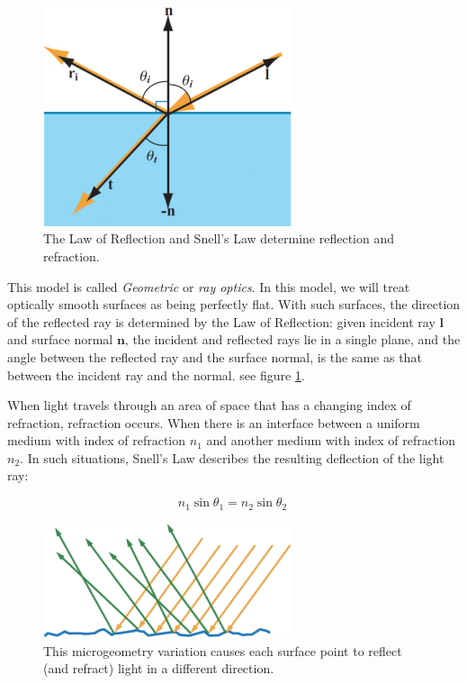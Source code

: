 \begin{figure}
\sidecaption
	\includegraphics[width=0.65\textwidth]{graphics/gi/ray-optics-1}
	\caption{The Law of Reflection and Snell's Law determine reflection and refraction.}
	\label{f:Ray-optics-model}
\end{figure}

This model is called \textit{Geometric} or \textit{ray optics}. In this model, we will treat optically smooth surfaces as being perfectly flat. With such surfaces, the direction of the reflected ray is determined by the Law of Reflection: given incident ray $\mathbf{l}$ and surface normal $\mathbf{n}$, the incident and reflected rays lie in a single plane, and the angle between the reflected ray and the surface normal, is the same as that between the incident ray and the normal. see figure \ref{f:Ray-optics-model}.

When light travels through an area of space that has a changing index of refraction, refraction occurs. When there is an interface between a uniform medium with index of refraction $n_1$ and another medium with index of refraction $n_2$. In such situations, Snell's Law describes the resulting deflection of the light ray:

\begin{equation}
	n_1\sin\theta_1 = n_2\sin\theta_2\ 	
\end{equation}

\begin{figure}
\sidecaption
	\includegraphics[width=0.65\textwidth]{graphics/gi/ray-optics-3}
	\caption{This microgeometry variation causes each surface point to reflect (and refract) light in a different direction.}
	\label{f:microgeometry}
\end{figure}

